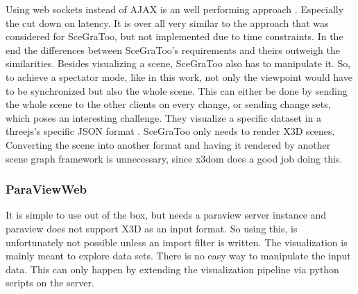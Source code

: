 Using web sockets instead of AJAX is an well performing approach
\cite{Marion:2012:RCS:2338714.2338721}. Especially the cut down on latency. It is
over all very similar to the approach that was considered for SceGraToo, but not
implemented due to time constraints. In the end the differences between
SceGraToo's requirements and theirs outweigh the similarities. Besides visualizing a scene,
\gls{SceGraToo} also has to manipulate it. So, to achieve a spectator mode,
like in this work, not only the viewpoint would have to be synchronized but also
the whole scene. This can either be done by sending the whole scene to the other
clients on every change, or sending change sets, which poses an interesting
challenge. They visualize a specific dataset in a threejs's specific \gls{JSON} format
\cite{threejs-format}. \gls{SceGraToo} only needs to render \gls{X3D} scenes. Converting the
scene into another format and having it rendered by another scene graph framework
is unnecessary, since x3dom does a good job doing this.

\subsubsection{ParaViewWeb}
\label{paraviewweb-pvweb}

It is simple to use out of the box, but needs a paraview server instance and
paraview does not support \gls{X3D} as an input format. So using this, is unfortunately
not possible unless an import filter is written. The visualization is
mainly meant to explore data sets. There is no easy way to manipulate
the input data. This can only happen by extending the visualization
pipeline via python scripts on the server.
